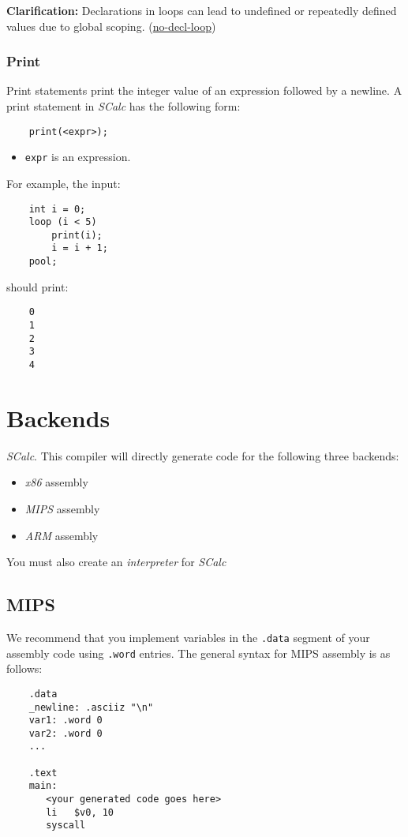 \documentclass{article}
\newcommand{\code}[1]{\texttt{\textmd{#1}}}
\newcommand{\clarification}[2]{\textbf{Clarification: }#1 (\hyperlink{#2}{#2})}
\begin{document}
\clarification{Declarations in loops can lead to undefined or repeatedly defined values due to
global scoping.} {no-decl-loop}

\subsubsection{Print}
\label{sssec:print}
Print statements print the integer value of an expression followed by a newline. A print statement
in \textit{SCalc} has the following form:
\begin{lstlisting}
	print(<expr>);
\end{lstlisting}

\begin{itemize}
	\item \code{expr} is an expression.
\end{itemize}

For example, the input:
\begin{lstlisting}
	int i = 0;
	loop (i < 5)
		print(i);
		i = i + 1;
	pool;
\end{lstlisting}
should print:
\begin{lstlisting}
	0
	1
	2
	3
	4
\end{lstlisting}

\section{Backends}

\textit{SCalc}. This compiler will directly generate code for the following three backends:
\begin {itemize}
	\item \textit{x86} assembly
	\item \textit{MIPS} assembly
	\item \textit{ARM} assembly
\end {itemize}
You must also create an \textit{interpreter} for \textit{SCalc}

\subsection{MIPS}
We recommend that you implement variables in the \code{.data} segment of your assembly code using \code{.word} entries. The
general syntax for MIPS assembly is as follows:

\begin{lstlisting}
	.data
	_newline: .asciiz "\n"
	var1: .word 0
	var2: .word 0
	...

	.text
	main:
	   <your generated code goes here>
	   li   $v0, 10
	   syscall
\end{lstlisting}
\end{document}
